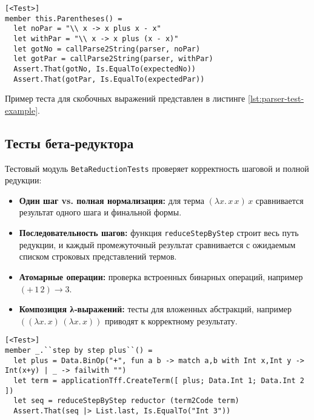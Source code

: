 \begin{lstlisting}[float=tb,frame=lines,label=lst:parser-test-example,caption={Пример теста для скобочных выражений}]
[<Test>]
member this.Parentheses() =
  let noPar = "\\ x -> x plus x - x"
  let withPar = "\\ x -> x plus (x - x)"
  let gotNo = callParse2String(parser, noPar)
  let gotPar = callParse2String(parser, withPar)
  Assert.That(gotNo, Is.EqualTo(expectedNo))
  Assert.That(gotPar, Is.EqualTo(expectedPar))
\end{lstlisting}

Пример теста для скобочных выражений представлен в листинге \ref{lst:parser-test-example}.

\subsection{Тесты бета‑редуктора}

Тестовый модуль \texttt{BetaReductionTests} проверяет корректность шаговой и полной редукции:

\begin{itemize}
  \item \textbf{Один шаг vs. полная нормализация:} для терма \((\lambda x.\,x\,x)\,x\) сравнивается результат одного шага и финальной формы.  
  \item \textbf{Последовательность шагов:} функция \texttt{reduceStepByStep} строит весь путь редукции, и каждый промежуточный результат сравнивается с ожидаемым списком строковых представлений термов.  
  \item \textbf{Атомарные операции:} проверка встроенных бинарных операций, например \((+\,1\,2)\to 3\).  
  \item \textbf{Композиция λ‑выражений:} тесты для вложенных абстракций, например \(((\lambda x.\,x)\,(\lambda x.\,x))\) приводят к корректному результату.  
\end{itemize}

\begin{lstlisting}[float=tb,frame=lines,label=lst:reductor-step-test,caption={Проверка последовательности шагов редукции}]
[<Test>]
member _.``step by step plus``() =
  let plus = Data.BinOp("+", fun a b -> match a,b with Int x,Int y -> Int(x+y) | _ -> failwith "")
  let term = applicationTff.CreateTerm([ plus; Data.Int 1; Data.Int 2 ])
  let seq = reduceStepByStep reductor (term2Code term)
  Assert.That(seq |> List.last, Is.EqualTo("Int 3"))
\end{lstlisting}

